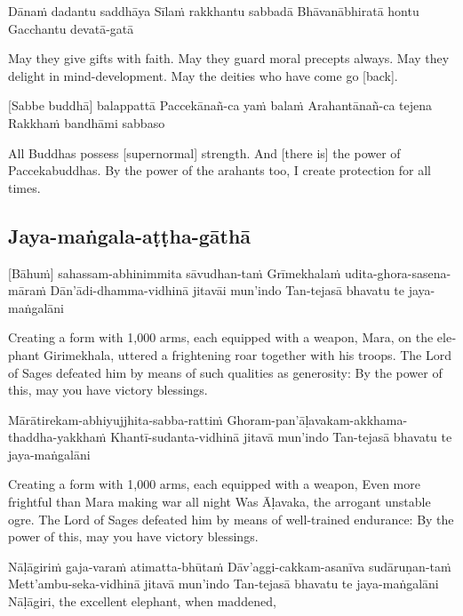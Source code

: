 Dānaṁ dadantu saddhāya
Sīlaṁ rakkhantu sabbadā
Bhāvanābhiratā hontu
Gacchantu devatā-gatā

\begin{english}
  May they give gifts with faith.
  May they guard moral precepts always.
  May they delight in mind-development.
  May the deities who have come go [back].
\end{english}

[Sabbe buddhā] balappattā
Paccekānañ-ca yaṁ balaṁ
Arahantānañ-ca tejena
Rakkhaṁ bandhāmi sabbaso

\begin{english}
  All Buddhas possess [supernormal] strength.
  And [there is] the power of Paccekabuddhas.
  By the power of the arahants too,
  I create protection for all times.
\end{english}

\suttaRef{[MJG]}

\subsection{Jaya-maṅgala-aṭṭha-gāthā}
[Bāhuṁ] sahassam-abhinimmita sāvudhan-taṁ
Grīmekhalaṁ udita-ghora-sasena-māraṁ
Dān’ādi-dhamma-vidhinā jitavāi mun’indo
Tan-tejasā bhavatu te jaya-maṅgalāni

\begin{english}
  Creating a form with 1,000 arms, each equipped with a weapon,
  Mara, on the elephant Girimekhala, uttered a frightening roar together with his troops.
  The Lord of Sages defeated him by means of such qualities as generosity:
  By the power of this, may you have victory blessings.
\end{english}

Mārātirekam-abhiyujjhita-sabba-rattiṁ
Ghoram-pan’āḷavakam-akkhama-thaddha-yakkhaṁ
Khantī-sudanta-vidhinā jitavā mun’indo
Tan-tejasā bhavatu te jaya-maṅgalāni

\begin{english}
  Creating a form with 1,000 arms, each equipped with a weapon,
  Even more frightful than Mara making war all night
  Was Āḷavaka, the arrogant unstable ogre.
  The Lord of Sages defeated him by means of well-trained endurance:
  By the power of this, may you have victory blessings.
\end{english}

Nāḷāgiriṁ gaja-varaṁ atimatta-bhūtaṁ
Dāv’aggi-cakkam-asanīva sudāruṇan-taṁ
Mett’ambu-seka-vidhinā jitavā mun’indo
Tan-tejasā bhavatu te jaya-maṅgalāni
Nāḷāgiri, the excellent elephant, when maddened,

